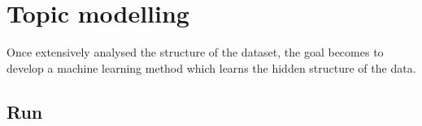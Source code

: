 \chapter{Topic modelling}\label{ch:topicmodelling}
Once extensively analysed the structure of the dataset, the goal becomes to develop a machine learning method which learns the hidden structure of the data.









\clearpage
\section{Run}\label{sec:run}


\clearpage


\clearpage


\clearpage

